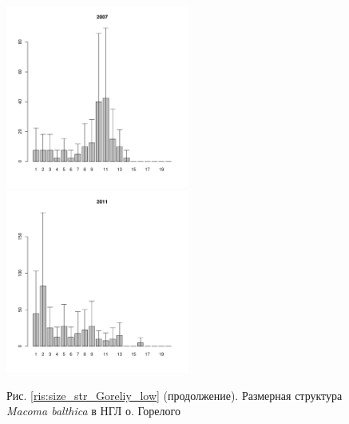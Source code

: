 \documentclass[12pt, a4paper]{article}
\begin{document}
\begin{figure}[h]

\begin{multicols}{3}
\hfill
\includegraphics[width=60mm]{../White_Sea/Luvenga_Goreliy/low_2007_.pdf}
\hfill
\includegraphics[width=60mm]{../White_Sea/Luvenga_Goreliy/low_2011_.pdf}
\end{multicols}


\begin{center}
Рис. \ref{ris:size_str_Goreliy_low} (продолжение). Размерная структура {\it Macoma balthica} в НГЛ
 о. Горелого

\end{center}
\end{figure}


\end{document}

